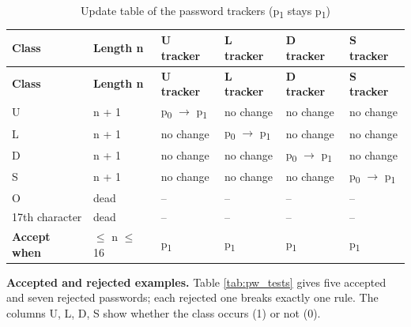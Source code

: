 \documentclass[12pt,a4paper]{article}
\begin{document}
{\small
\begin{longtable}{|>{\raggedright\arraybackslash}p{}|>{\centering\arraybackslash}p{}|>{\centering\arraybackslash}p{}|>{\centering\arraybackslash}p{}|>{\centering\arraybackslash}p{}|>{\centering\arraybackslash}p{}|}
\caption[Update table of the password trackers (p1 stays p1)]{Update table of the password trackers (p\textsubscript{1} stays p\textsubscript{1})}\label{tab:pw_delta}\\
\hline
\rowcolor{hdr}\textbf{Class} & \textbf{Length n} & \textbf{U tracker} & \textbf{L tracker} & \textbf{D tracker} & \textbf{S tracker}\\ \hline
\endfirsthead
\hline
\rowcolor{hdr}\textbf{Class} & \textbf{Length n} & \textbf{U tracker} & \textbf{L tracker} & \textbf{D tracker} & \textbf{S tracker}\\ \hline
\endhead
U & n + 1 & p\textsubscript{0} \ensuremath{\rightarrow} p\textsubscript{1} & no change & no change & no change\\ \hline
L & n + 1 & no change & p\textsubscript{0} \ensuremath{\rightarrow} p\textsubscript{1} & no change & no change\\ \hline
D & n + 1 & no change & no change & p\textsubscript{0} \ensuremath{\rightarrow} p\textsubscript{1} & no change\\ \hline
S & n + 1 & no change & no change & no change & p\textsubscript{0} \ensuremath{\rightarrow} p\textsubscript{1}\\ \hline
O & dead & -- & -- & -- & --\\ \hline
17th character & dead & -- & -- & -- & --\\ \hline
\textbf{Accept when} & 8 \ensuremath{\leq} n \ensuremath{\leq} 16 & p\textsubscript{1} & p\textsubscript{1} & p\textsubscript{1} & p\textsubscript{1}\\ \hline
\end{longtable}}

\textbf{Accepted and rejected examples.} Table \ref{tab:pw_tests} gives five accepted and seven rejected passwords; each rejected one breaks exactly one rule. The columns U, L, D, S show whether the class occurs (1) or not (0).
\end{document}
